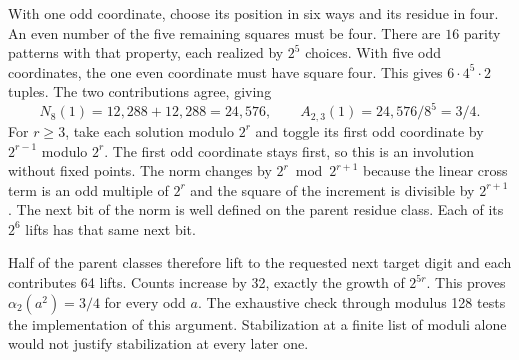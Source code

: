 \documentclass[12pt,letterpaper]{article}
\begin{document}
With one odd coordinate, choose its position in six ways and its residue in four. An even number of the five remaining squares must be four. There are \(16\) parity patterns with that property, each realized by \(2^5\) choices. With five odd coordinates, the one even coordinate must have square four. This gives \(6\cdot4^5\cdot2\) tuples. The two contributions agree, giving
\[
              N_8(1)=12{,}288+12{,}288=24{,}576,\qquad
              A_{2,3}(1)=24{,}576/8^5=3/4 .
\]
For \(r\ge3\), take each solution modulo \(2^r\) and toggle its first odd coordinate by \(2^{r-1}\) modulo \(2^r\). The first odd coordinate stays first, so this is an involution without fixed points. The norm changes by \(2^r\bmod2^{r+1}\) because the linear cross term is an odd multiple of \(2^r\) and the square of the increment is divisible by \(2^{r+1}\). The next bit of the norm is well defined on the parent residue class. Each of its \(2^6\) lifts has that same next bit.

Half of the parent classes therefore lift to the requested next target digit and each contributes 64 lifts. Counts increase by 32, exactly the growth of \(2^{5r}\). This proves \(\alpha_2(a^2)=3/4\) for every odd \(a\). The exhaustive check through modulus 128 tests the implementation of this argument. Stabilization at a finite list of moduli alone would not justify stabilization at every later one.
\end{document}
